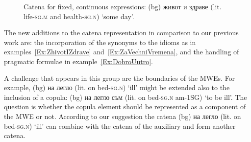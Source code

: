 \documentclass[output=paper,colorlinks,citecolor=brown]{langscibook}
\begin{document}
\begin{figure}[h]
  \begin{center}  

  
  \caption{Catena for fixed, continuous expressions: 
 (bg) {живот и здраве } (lit. life-\textsc{sg.m} and health-\textsc{sg.n}) {`some day'}.}
  \label{fig:FixCont01}
  \end{center}  

\end{figure}

The new additions to the catena representation in comparison to our previous work are: the incorporation of the synonyms to the idioms as in examples~\ref{Ex:ZhivotIZdrave} and~\ref{Ex:ZaVechniVremena}, and the handling of pragmatic formulae in example~\ref{Ex:DobroUutro}.

A challenge that appears in this group are the boundaries of the MWEs. For example, (bg) {на легло } (lit. on bed-\textsc{sg.n}) {`ill'} might be extended also to the inclusion of a copula: 
(bg) {на легло съм } (lit. on bed-\textsc{sg.n} am-1SG) {`to be ill'}. The question is whether the copula element should be represented as a component of the MWE or not. According to our suggestion the catena (bg) {на легло } (lit. on bed-\textsc{sg.n}) {`ill'} can combine with the catena of the auxiliary and form another catena.
\end{document}

